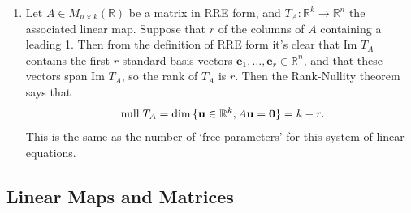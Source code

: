 \documentclass[12pt]{report}
\theoremstyle{definition}
\begin{document}
\begin{ex}
\begin{enumerate}[label = (\alph*)]
        \item Let $A \in M_{n\times k}(\mathbb{R})$ be a matrix in RRE form, and
            $T_A:\mathbb{R}^{k} \rightarrow{} \mathbb{R}^{n}$ the associated linear map.
            Suppose that $r$ of the columns of $A$ containing a leading 1.
            Then from the definition of RRE form it's clear that Im $T_A$ contains
            the first $r$ standard basis vectors $\mathbf{e}_1, \ldots, \mathbf{e}_r \in \mathbb{R}^{n}$,
            and that these vectors span Im $T_A$, so the rank of $T_A$ is $r$.
            Then the Rank-Nullity theorem says that\[
                \;\textnormal{null}\;T_A = \dim{\{\mathbf{u}\in \mathbb{R}^{k}, A\mathbf{u} = \mathbf{0}\}} = k - r.
            \]This is the same as the number of `free parameters' for this system of linear equations.
    \end{enumerate}
    
\end{ex}


\subsection{Linear Maps and Matrices}
\end{document}
